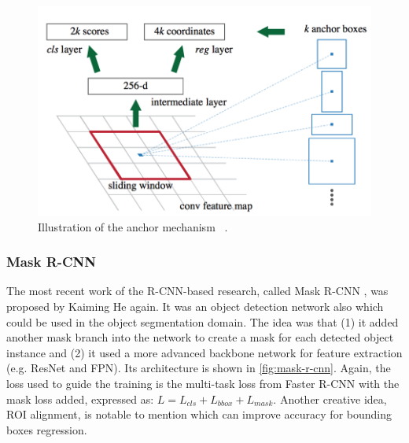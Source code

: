 \begin{figure}
    \begin{center}
    \includegraphics[scale=0.6]{figures/anchor.png}
    \end{center}
    \caption{Illustration of the anchor mechanism
    ~\protect\cite{faster-r-cnn-paper-2015}.}
    \label{fig:anchor}
\end{figure}


\subsubsection{Mask R-CNN}

The most recent work of the R-CNN-based research, called Mask
R-CNN \cite{mask-r-cnn-paper-2017}, was proposed
by Kaiming He again. It was an object detection network also which could be
used in the object segmentation domain. The idea
was that (1) it added another mask branch into the network to create a mask for
each detected object instance and (2) it used a
more advanced backbone network for feature extraction (e.g. ResNet and FPN).
Its architecture is shown in \autoref{fig:mask-r-cnn}.
Again, the loss used to guide the training is the multi-task loss from Faster
R-CNN with the mask loss added, expressed as:
$L = L_{cls} + L_{bbox} + L_{mask}$. Another creative idea, ROI alignment, is
notable to mention which can improve accuracy for bounding boxes regression.

